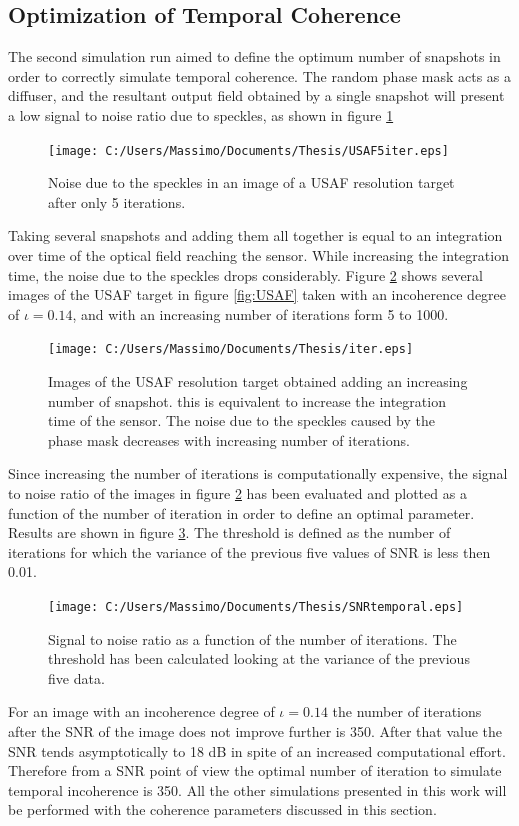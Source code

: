  \subsection{Optimization of Temporal Coherence}
The second simulation run aimed to define the optimum number of snapshots in order to correctly simulate temporal coherence. The random phase mask acts as a diffuser, and the resultant output field obtained by a single snapshot will present a low signal to noise ratio due to speckles, as shown in figure \ref{fig:speckle}
\begin{figure}[H]
	\centering
	\texttt{[image: C:/Users/Massimo/Documents/Thesis/USAF5iter.eps]}
	\caption{\label{fig:speckle}Noise due to the speckles in an image of a USAF resolution target after only 5 iterations.}
\end{figure}
Taking several snapshots and adding them all together is equal to an integration over time of the optical field reaching the sensor. While increasing the integration time, the noise due to the speckles drops considerably. Figure \ref{fig:iter} shows several images of the USAF target in figure \ref{fig:USAF} taken with an incoherence degree of $\iota=0.14$, and with an increasing number of iterations form 5 to 1000.
 \begin{figure}[H]
 	\centering
 	\texttt{[image: C:/Users/Massimo/Documents/Thesis/iter.eps]}
 	\caption{\label{fig:iter}Images of the USAF resolution target obtained adding an increasing number of snapshot. this is equivalent to increase the integration time of the sensor. The noise due to the speckles caused by the phase mask decreases with increasing number of iterations.}
 \end{figure}
 Since increasing the number of iterations is computationally expensive, the signal to noise ratio of the images in figure \ref{fig:iter} has been evaluated and plotted as a function of the number of iteration in order to define an optimal parameter. Results are shown in figure \ref{fig:SNRiter}. The threshold is defined as the number of iterations for which the variance of the previous five values of SNR is less then 0.01.
 \begin{figure}[H]
 	\centering
 	\texttt{[image: C:/Users/Massimo/Documents/Thesis/SNRtemporal.eps]}
 	\caption{\label{fig:SNRiter}Signal to noise ratio as a function of the number of iterations. The threshold has been calculated looking at the variance of the previous five data.}
 \end{figure}
 For an image with an incoherence degree of $\iota=0.14$ the number of iterations after the SNR of the image does not improve further is 350. After that value the SNR tends asymptotically to 18 dB in spite of an increased computational effort. Therefore from a SNR point of view the optimal number of iteration to simulate temporal incoherence is 350. All the other simulations presented in this work will be performed with the coherence parameters discussed in this section. 
